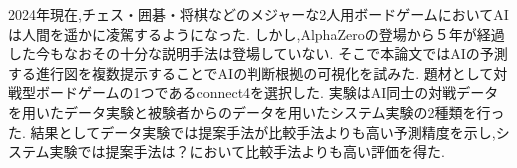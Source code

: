 \abstract
2024年現在,チェス・囲碁・将棋などのメジャーな2人用ボードゲームにおいてAIは人間を遥かに凌駕するようになった\cite{Nikkei}\cite{deepBlue}\cite{dennou}.
しかし,AlphaZero\cite{AlphaZero}の登場から５年が経過した今もなおその十分な説明手法は登場していない.
そこで本論文ではAIの予測する進行図を複数提示することでAIの判断根拠の可視化を試みた.
題材として対戦型ボードゲームの1つであるconnect4を選択した.
実験はAI同士の対戦データを用いたデータ実験と被験者からのデータを用いたシステム実験の2種類を行った.
結果としてデータ実験では提案手法が比較手法よりも高い予測精度を示し,システム実験では提案手法は？において比較手法よりも高い評価を得た.